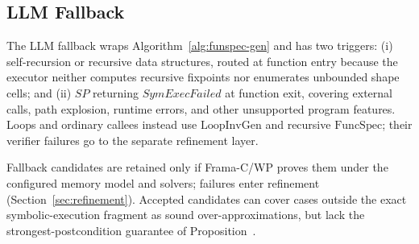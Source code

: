 \subsection{LLM Fallback}
\label{sec:llm-fallback}

The LLM fallback wraps Algorithm~\ref{alg:funspec-gen} and has two triggers: (i) self-recursion or recursive data structures, routed at function entry because the executor neither computes recursive fixpoints nor enumerates unbounded shape cells; and (ii) $\textit{SP}$ returning $\textit{SymExecFailed}$ at function exit, covering external calls, path explosion, runtime errors, and other unsupported program features. Loops and ordinary callees instead use $\mathrm{LoopInvGen}$ and recursive $\mathrm{FuncSpec}$; their verifier failures go to the separate refinement layer.


Fallback candidates are retained only if Frama-C/WP proves them under the configured memory model and solvers; failures enter refinement (Section~\ref{sec:refinement}). Accepted candidates can cover cases outside the exact symbolic-execution fragment as sound over-approximations, but lack the strongest-postcondition guarantee of Proposition~.

